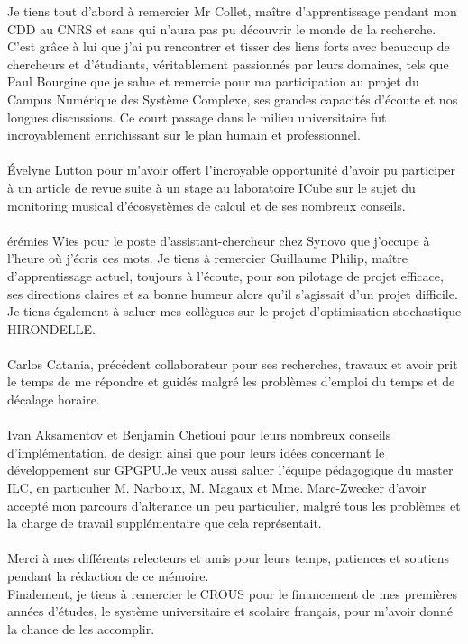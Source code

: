 \documentclass[french, 11pt]{memoir}
\begin{document}
Je tiens tout d'abord à remercier Mr Collet, maître d'apprentissage
pendant mon CDD au CNRS et sans qui n'aura pas pu découvrir le monde de
la recherche. C'est grâce à lui que j'ai pu rencontrer et tisser des
liens forts avec beaucoup de chercheurs et d'étudiants, véritablement
passionnés par leurs domaines, tels que Paul Bourgine que je salue et
remercie pour ma participation au projet du Campus Numérique des Système
Complexe, ses grandes capacités d'écoute et nos longues discussions. Ce
court passage dans le milieu universitaire fut incroyablement
enrichissant sur le plan humain et professionnel.
\\ \\
Évelyne Lutton pour m'avoir offert l'incroyable opportunité d'avoir pu
participer à un article de revue suite à un stage au laboratoire ICube
sur le sujet du monitoring musical d'écosystèmes de calcul et de ses
nombreux conseils.
\\ \\
érémies Wies pour le poste d'assistant-chercheur chez Synovo que
j'occupe à l'heure où j'écris ces mots. Je tiens à remercier Guillaume
Philip, maître d'apprentissage actuel, toujours à l'écoute, pour son
pilotage de projet efficace, ses directions claires et sa bonne humeur
alors qu'il s'agissait d'un projet difficile. Je tiens également à
saluer mes collègues sur le projet d'optimisation stochastique
HIRONDELLE.
\\ \\
Carlos Catania, précédent collaborateur pour ses recherches, travaux et
avoir prit le temps de me répondre et guidés malgré les problèmes
d'emploi du temps et de décalage horaire.
\\ \\
Ivan Aksamentov et Benjamin Chetioui pour leurs nombreux conseils
d'implémentation, de design ainsi que pour leurs idées concernant le
développement sur GPGPU.Je veux aussi saluer l'équipe pédagogique du
master ILC, en particulier M. Narboux, M. Magaux et Mme. Marc-Zwecker
d'avoir accepté mon parcours d'alterance un peu particulier, malgré tous
les problèmes et la charge de travail supplémentaire que cela
représentait.
\\ \\
Merci à mes différents relecteurs et amis pour leurs temps, patiences et
soutiens pendant la rédaction de ce mémoire. \\ Finalement, je tiens à
remercier le CROUS pour le financement de mes premières années d'études,
le système universitaire et scolaire français, pour m'avoir donné la
chance de les accomplir.
\end{document}
